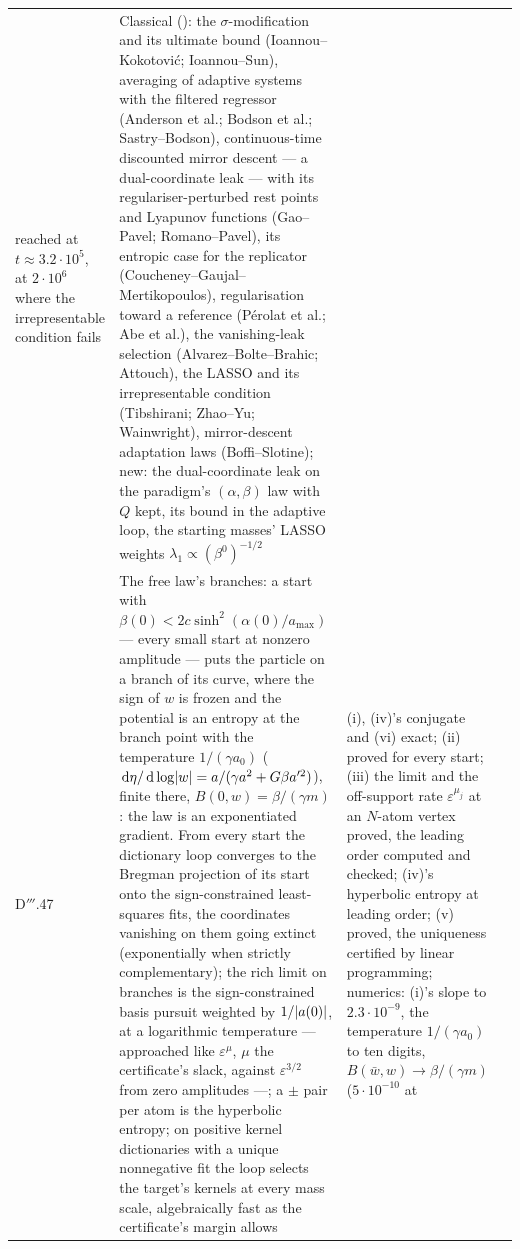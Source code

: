 {\begin{longtable}{@{}>{\raggedright\arraybackslash}p{}>{\raggedright\arraybackslash}p{}%
>{\raggedright\arraybackslash}p{}>{\raggedright\arraybackslash}p{}@{}}
reached at $t\approx3.2\cdot10^5$, at $2\cdot10^6$ where the irrepresentable condition fails
& Classical (\cite{S73}): the $\sigma$-modification and its ultimate bound (Ioannou--Kokotovi\'c; Ioannou--Sun),
averaging of adaptive systems with the filtered regressor (Anderson et al.; Bodson et al.; Sastry--Bodson),
continuous-time discounted mirror descent --- a dual-coordinate leak --- with its regulariser-perturbed rest points and
Lyapunov functions (Gao--Pavel; Romano--Pavel), its entropic case for the replicator
(Coucheney--Gaujal--Mertikopoulos), regularisation toward a reference (P\'erolat et al.; Abe et al.), the vanishing-leak
selection (Alvarez--Bolte--Brahic; Attouch), the LASSO and its irrepresentable condition (Tibshirani; Zhao--Yu;
Wainwright), mirror-descent adaptation laws (Boffi--Slotine); new: the dual-coordinate leak on the paradigm's
$(\alpha,\beta)$ law with $Q$ kept, its bound in the adaptive loop, the starting masses' LASSO weights
$\lambda_1\propto(\beta^0)^{-1/2}$\\
\addlinespace[0.5pt]
D$'''$.47 & The free law's branches: a start with $\beta(0) < 2c\sinh^2(\alpha(0)/a_{\max})$ --- every small start at
nonzero amplitude --- puts the particle on a branch of its curve, where the sign of $w$ is frozen and the potential is an
entropy at the branch point with the temperature $1/(\gamma a_0)$
($\,\mathrm{d}\eta/\,\mathrm{d}\log\lvert w\rvert = a/(\gamma a^2 + G\beta a'^2)$), finite there, $B(0,w) = \beta/(\gamma m)$: the law is an
exponentiated gradient. From every start the dictionary loop converges to the Bregman projection of its start onto the
sign-constrained least-squares fits, the coordinates vanishing on them going extinct (exponentially when strictly
complementary); the rich limit on branches is the sign-constrained basis pursuit weighted by $1/\lvert a(0)\rvert$, at a
logarithmic temperature --- approached like $\varepsilon^\mu$, $\mu$ the certificate's slack, against
$\varepsilon^{3/2}$ from zero amplitudes ---; a $\pm$ pair per atom is the hyperbolic entropy; on positive kernel
dictionaries with a unique nonnegative fit the loop selects the target's kernels at every mass scale, algebraically
fast as the certificate's margin allows
& (i), (iv)'s conjugate and (vi) exact; (ii) proved for every start; (iii) the limit and the off-support rate
$\varepsilon^{\mu_j}$ at an $N$-atom vertex proved, the leading order computed and checked; (iv)'s hyperbolic entropy at
leading order; (v) proved, the uniqueness certified by linear programming; numerics: (i)'s slope to $2.3\cdot10^{-9}$,
the temperature $1/(\gamma a_0)$ to ten digits, $B(\bar w,w)\to\beta/(\gamma m)$ ($5\cdot10^{-10}$ at

\end{longtable}}
